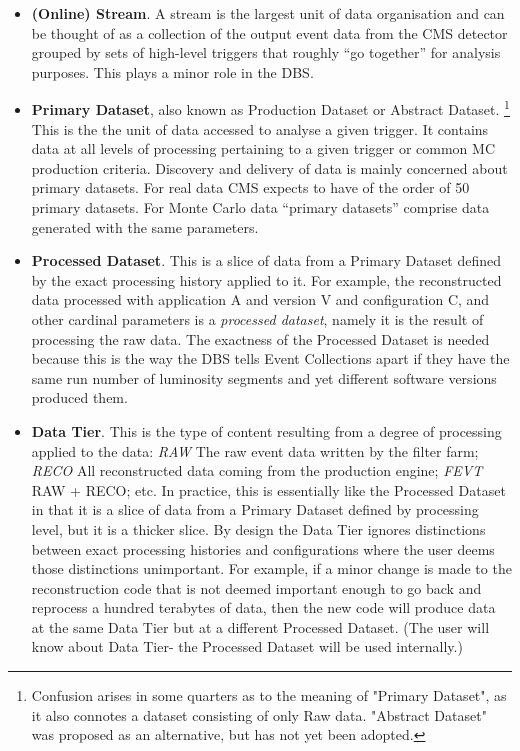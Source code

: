 \documentclass{cmspaper}
\begin{document}
\begin{itemize}
\item {\bf (Online) Stream}.  A stream is the largest unit of data organisation
and can be thought of as a collection of the output event data from the CMS
detector grouped by sets of high-level triggers that roughly ``go together'' 
for analysis purposes. This plays a minor role in the DBS.

\item {\bf Primary Dataset}, also known as Production Dataset or Abstract Dataset. 
\footnote{Confusion arises in some quarters as to the meaning of "Primary Dataset", as 
it also connotes a dataset consisting of only Raw data. "Abstract Dataset" was proposed
as an alternative, but has not yet been adopted.} This is the the unit of 
data accessed to analyse a given trigger.  It contains data at all levels of 
processing pertaining to a given trigger or common MC production criteria.
Discovery and delivery of data is mainly concerned about primary datasets.
For real data CMS expects to have of the order of 50 primary datasets.  
For Monte Carlo data ``primary datasets'' comprise data generated with the 
same parameters.

\item {\bf Processed Dataset}. This is a slice of data from a Primary Dataset
defined by the exact processing history applied to it.  For example, the reconstructed data
processed with application A and version V and configuration C, and other cardinal 
parameters is a 
{\em processed dataset}, namely it is the result of processing the raw data.  The 
exactness of the Processed Dataset is needed because this is the way the DBS 
tells Event Collections apart if they have the same run number of luminosity 
segments and yet different software versions produced them.


\item {\bf Data Tier}. This is the type of content resulting from a 
degree of processing applied to the data: {\em RAW} The raw event data 
written by the filter farm; {\em RECO} All reconstructed data coming from 
the production engine; {\em FEVT} RAW + RECO; etc. In practice, this is essentially
like the Processed Dataset in that it is a slice of data from a Primary Dataset 
defined by processing level, but it is a thicker slice.   By design the 
Data Tier ignores distinctions between exact processing histories and 
configurations where the user deems those distinctions unimportant.  For example, 
if a minor change is made to the reconstruction code that is not deemed 
important enough to go back and reprocess a hundred terabytes of data, then 
the new code will produce data at the same Data Tier but at a different 
Processed Dataset.  (The user will know about Data Tier- the Processed Dataset 
will be used internally.)


\end{itemize}
\end{document}
